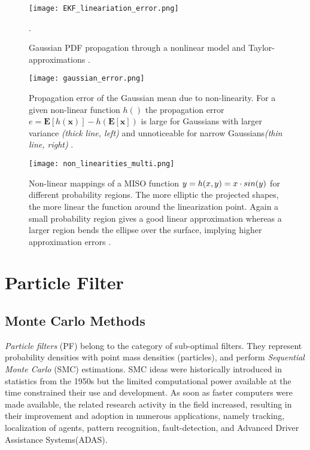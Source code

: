 \begin{figure}[H]
	\centering
	\texttt{[image: EKF\_lineariation\_error.png]}
	\caption{Gaussian PDF propagation through a nonlinear model and Taylor-approximations \cite{Thrun2005}.}.
	\label{fig:taylor_approximation}
\end{figure}


\begin{figure}[H]
	\centering
	\texttt{[image: gaussian\_error.png]}
	
	\caption{Propagation error  of the Gaussian mean due to non-linearity. For a given non-linear function $h()$ the propagation error $e=\mathbf{E}[h(\mathbf{x})]-h(\mathbf{E}[\mathbf{x}])$ is large for Gaussians with larger variance \textit{(thick line, left)} and unnoticeable for narrow Gaussians\textit{(thin line, right)} \cite{Sola2011}.}
	
	\label{fig:taylor_approximation2}
\end{figure}


\begin{figure}[H]
	\centering
	\texttt{[image: non\_linearities\_multi.png]}
	\caption{Non-linear mappings of a MISO function ${{y}}=h(x,y) = x \cdot sin(y)$ for different probability regions. The more elliptic the projected shapes, the more linear the function around the linearization point. Again a small probability region gives a good linear approximation whereas a larger region bends the ellipse over the surface, implying higher approximation errors \cite{Sola2011}.}
	\label{fig:nonlinearitiesmulti}
\end{figure}

\section{Particle Filter}
\subsection{Monte Carlo Methods}
\emph{Particle filters} (PF) belong to the category of sub-optimal filters. They represent probability densities with point mass densities (particles), and perform \emph{Sequential Monte Carlo} (SMC) estimations. SMC ideas were historically introduced in statistics from the 1950s but the limited computational power available at the time constrained their use and development. As soon as faster computers were made available, the related research activity in the field increased, resulting in their improvement and adoption in numerous applications, namely tracking, localization of agents, pattern recognition, fault-detection, and Advanced Driver Assistance Systems(ADAS). 

